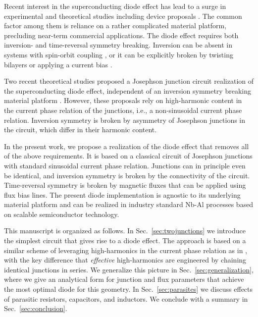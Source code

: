 \documentclass[aps,rsi,reprint,amsmath,amssymb,floatfix,longbibliography,superscriptaddress]{revtex4-1}
\begin{document}
Recent interest in the superconducting diode effect has lead to a surge in
experimental \cite{Wakatsuki2017,Yasuda2019, Ando2020,Pal2021, Lyu2021, Shin2021, Lin2022,Jiang2022,Bauriedl2022, Baumgartner2022,Wu2022}
and theoretical studies
\cite{Hoshino2018, Misaki2021, Kopasov2021, Daido2022, Zinkl2022, Davydova2022, Halterman2022, Scammell2022, Yuan2022, Zhang2022, Zhai2022, Ilic2022, Tanaka2022} including device proposals \cite{Hu2007}. The common factor among them is
reliance on a rather complicated material platform, precluding near-term
commercial applications. The diode effect requires both inversion- and
time-reversal symmetry breaking. Inversion can be absent in
systems with spin-orbit coupling \cite{Ilic2022, Baumgartner2022}, 
or it can be explicitly broken by twisting bilayers \cite{Lin2022, Scammell2022, Ghosh2022}
or applying a current bias \cite{Chiles2022}. 

Two recent theoretical studies proposed a Josephson junction circuit realization of the
superconducting diode effect, independent of an inversion symmetry breaking material platform \cite{Fominov2022, Schrade2022}. However, these
proposals rely on high-harmonic content in the current phase relation of the junctions, 
i.e., a non-sinusoidal current phase relation. Inversion symmetry is
broken by asymmetry of Josephson junctions in the circuit, which differ in their
harmonic content.

In the present work, we propose a realization of the diode effect that
removes all of the above requirements. It is based on a classical circuit of
Josephson junctions with standard sinusoidal current phase relation. Junctions
can in principle even be identical, and inversion symmetry is broken by the
connectivity of the circuit. Time-reversal symmetry is broken by magnetic
fluxes that can be applied using flux bias lines. 
The present diode implementation is agnostic to its underlying material platform and can be
realized in industry standard Nb-Al processes based on scalable semiconductor
technology.

This manuscript is organized as follows. In Sec.~\ref{sec:twojunctions} we
introduce the simplest circuit that gives rise to a diode effect. The approach 
is based on a similar scheme of leveraging high-harmonics in the current phase relation as in \cite{Fominov2022, Schrade2022}, with the key difference that
\textit{effective} high-harmonics are engineered
by chaining identical junctions in series. We generalize this picture in
Sec.~\ref{sec:generalization}, where we give an analytical form for junction
and flux parameters that achieve the most optimal diode for this geometry. In Sec.~\ref{sec:parasites} we discuss effects of parasitic resistors, capacitors, and
inductors.
We conclude with a summary in Sec.~\ref{sec:conclusion}.
\end{document}
